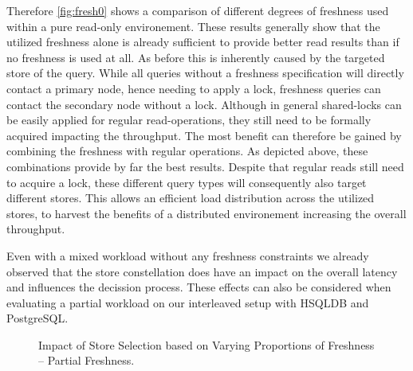 Therefore \ref{fig:fresh0} shows a comparison of different degrees of freshness used within a pure read-only environement.
These results generally show that the utilized freshness alone is already sufficient to provide better read results than if no freshness is used at all.
As before this is inherently caused by the targeted store of the query. While all queries without a freshness specification will directly contact a primary node,
hence needing to apply a lock, freshness queries can contact the secondary node without a lock. Although in general shared-locks can be easily applied for regular read-operations, they still need to be formally acquired impacting
the throughput. The most benefit can therefore be gained by combining the freshness with regular operations. As depicted above, these combinations provide by far 
the best results. Despite that regular reads still need to acquire a lock, these different query types will consequently also target different stores. 
This allows an efficient load distribution across the utilized stores, to harvest the benefits of a distributed environement increasing the overall throughput.




Even with a mixed workload without any freshness constraints we already observed that the store constellation does have an impact on the overall latency 
and influences the decission process. 
These effects can also be considered when evaluating a partial workload on our interleaved setup with HSQLDB and PostgreSQL.


\begin{figure}[t] 
    \centering 
    \caption{Impact of Store Selection based on Varying Proportions of Freshness -- Partial Freshness.}
    \label{fig:mixed}
\end{figure}

